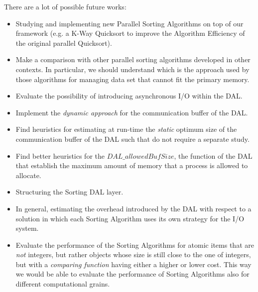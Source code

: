 There are a lot of possible future works:  
\begin{itemize}
\item Studying and implementing new Parallel Sorting Algorithms on top of our framework (e.g. a K-Way Quicksort to improve the Algorithm Efficiency of the original parallel Quicksort).
\item Make a comparison with other parallel sorting algorithms developed in other contexts. In particular, we should understand which is the approach used by those algorithms for managing data set that cannot fit the primary memory.
\item Evaluate the possibility of introducing asynchronous I/O within the DAL.
\item Implement the \textit{dynamic approach} for the communication buffer of the DAL.
\item Find heuristics for estimating at run-time the \textit{static} optimum size of the communication buffer of the DAL such that do not require a separate study.
\item Find better heuristics for the $DAL\_allowedBufSize$, the function of the DAL that establish the maximum amount of memory that a process is allowed to allocate.
\item Structuring the Sorting DAL layer.
\item In general, estimating the overhead introduced by the DAL with respect to a solution in which each Sorting Algorithm uses its own strategy for the I/O system.
\item Evaluate the performance of the Sorting Algorithms for atomic items that are \textit{not} integers, but rather objects whose size is still close to the one of integers, but with a \textit{comparing function} having either a higher or lower cost. This way we would be able to evaluate the performance of Sorting Algorithms also for different computational grains.
\end{itemize}